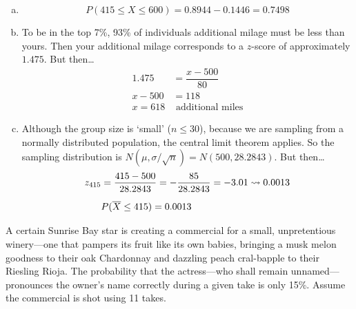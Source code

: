 \documentclass[12pt,letterpaper]{exam}
\begin{document}
\begin{questions}
\begin{enumerate}[(a)]
\item 
	\[
	P(415 \leq X \leq 600)= 0.8944 - 0.1446= 0.7498
	\] \vfill

\item To be in the top 7\%, 93\% of individuals additional milage must be less than yours. Then your additional milage corresponds to a $z$-score of approximately $1.475$. But then\dots
	\[
	\begin{aligned}
	1.475&= \dfrac{x - 500}{80} \\
	x - 500&= 118 \\
	x= 618& \text{ additional miles}
	\end{aligned}
	\] \vfill

\item Although the group size is `small' ($n \leq 30$), because we are sampling from a normally distributed population, the central limit theorem applies. So the sampling distribution is $N(\mu, \sigma/\sqrt{n})= N(500, 28.2843)$. But then\dots
	\[
	\begin{aligned}
	z_{415}&= \dfrac{415 - 500}{28.2843}= -\dfrac{85}{28.2843}= -3.01 \rightsquigarrow 0.0013 \\[0.2cm]
	&P(\overline{X} \leq 415)= 0.0013
	\end{aligned}
	\] \vfill
\end{enumerate}





\newpage
\question A certain Sunrise Bay star is creating a commercial for a small, unpretentious winery---one that pampers its fruit like its own babies, bringing a musk melon goodness to their oak Chardonnay and dazzling peach cral-bapple to their Riesling Rioja. The probability that the actress---who shall remain unnamed---pronounces the owner's name correctly during a given take is only 15\%. Assume the commercial is shot using 11 takes. 
\end{questions}
\end{document}

